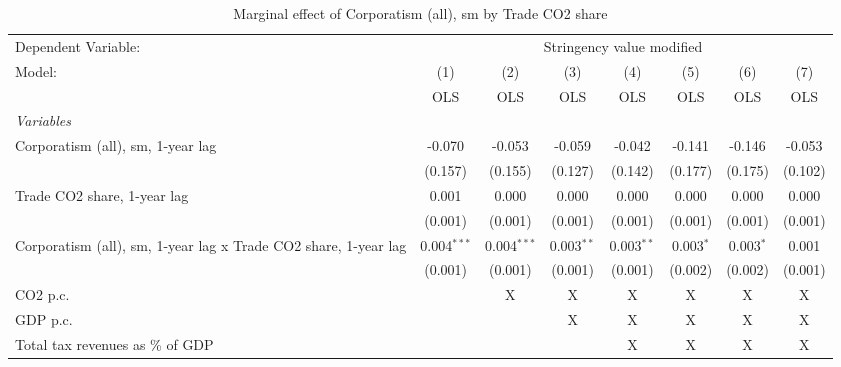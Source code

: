 
\begin{table}[htbp]
   \caption{Marginal effect of Corporatism (all), sm by Trade CO2 share}
   \centering
   \begin{tabular}{lccccccc}
      \toprule
      Dependent Variable: & \multicolumn{7}{c}{Stringency value modified}\\
      Model:                                                          & (1)           & (2)           & (3)          & (4)          & (5)         & (6)         & (7)\\  
                                                                      &  OLS          & OLS           & OLS          & OLS          & OLS         & OLS         & OLS\\  
      \midrule
      \emph{Variables}\\
      Corporatism (all), sm, 1-year lag                               & -0.070        & -0.053        & -0.059       & -0.042       & -0.141      & -0.146      & -0.053\\   
                                                                      & (0.157)       & (0.155)       & (0.127)      & (0.142)      & (0.177)     & (0.175)     & (0.102)\\   
      Trade CO2 share, 1-year lag                                     & 0.001         & 0.000         & 0.000        & 0.000        & 0.000       & 0.000       & 0.000\\   
                                                                      & (0.001)       & (0.001)       & (0.001)      & (0.001)      & (0.001)     & (0.001)     & (0.001)\\   
      Corporatism (all), sm, 1-year lag x Trade CO2 share, 1-year lag & 0.004$^{***}$ & 0.004$^{***}$ & 0.003$^{**}$ & 0.003$^{**}$ & 0.003$^{*}$ & 0.003$^{*}$ & 0.001\\   
                                                                      & (0.001)       & (0.001)       & (0.001)      & (0.001)      & (0.002)     & (0.002)     & (0.001)\\   
      CO2 p.c.                                                        &               & X             & X            & X            & X           & X           & X\\  
      GDP p.c.                                                        &               &               & X            & X            & X           & X           & X\\  
      Total tax revenues as \% of GDP                                 &               &               &              & X            & X           & X           & X\\  

\end{tabular}
\end{table}
